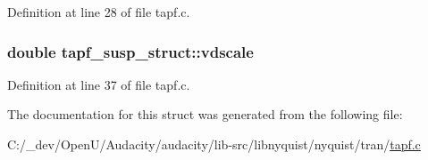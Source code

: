 Definition at line 28 of file tapf.\+c.

\subsubsection[{\texorpdfstring{vdscale}{vdscale}}]{\setlength{\rightskip}{0pt plus 5cm}double tapf\+\_\+susp\+\_\+struct\+::vdscale}\hypertarget{structtapf__susp__struct_aafb43668af19062c086eb9649bc1e0b9}{}\label{structtapf__susp__struct_aafb43668af19062c086eb9649bc1e0b9}


Definition at line 37 of file tapf.\+c.



The documentation for this struct was generated from the following file\+:\begin{DoxyCompactItemize}
\item 
C\+:/\+\_\+dev/\+Open\+U/\+Audacity/audacity/lib-\/src/libnyquist/nyquist/tran/\hyperlink{tapf_8c}{tapf.\+c}\end{DoxyCompactItemize}
